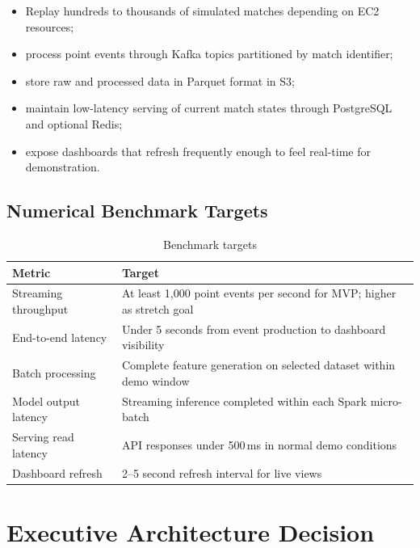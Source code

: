 \documentclass[11pt,a4paper]{article}
\begin{document}
\begin{itemize}[nosep]
  \item Replay hundreds to thousands of simulated matches depending on EC2 resources;
  \item process point events through Kafka topics partitioned by match identifier;
  \item store raw and processed data in Parquet format in S3;
  \item maintain low-latency serving of current match states through PostgreSQL and optional Redis;
  \item expose dashboards that refresh frequently enough to feel real-time for demonstration.
\end{itemize}

\subsection{Numerical Benchmark Targets}

\begin{table}[H]
\centering
\begin{tabularx}{\linewidth}{L{5.5cm}X}
\toprule
\textbf{Metric} & \textbf{Target} \\
\midrule
Streaming throughput & At least 1,000 point events per second for MVP; higher as stretch goal \\
End-to-end latency & Under 5 seconds from event production to dashboard visibility \\
Batch processing & Complete feature generation on selected dataset within demo window \\
Model output latency & Streaming inference completed within each Spark micro-batch \\
Serving read latency & API responses under 500\,ms in normal demo conditions \\
Dashboard refresh & 2--5 second refresh interval for live views \\
\bottomrule
\end{tabularx}
\caption{Benchmark targets}
\end{table}

\section{Executive Architecture Decision}
\end{document}
